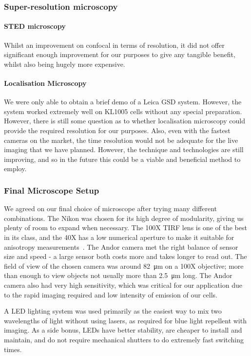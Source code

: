 \documentclass[../main.tex]{subfiles}
\begin{document}
\subsubsection{Super-resolution microscopy}

\paragraph{STED microscopy} Whilst an improvement on confocal in terms of resolution, it did not offer significant enough improvement for our purposes to give any tangible benefit, whilst also being hugely more expensive.

\paragraph{Localisation Microscopy} We were only able to obtain a brief demo of a Leica GSD system. However, the system worked extremely well on KL1005 cells without any special preparation. However, there is still some question as to whether localisation microscopy could provide the required resolution for our purposes. Also, even with the fastest cameras on the market, the time resolution would not be adequate for the live imaging that we have planned. However, the technique and technologies are still improving, and so in the future this could be a viable and beneficial method to employ.

\subsubsection{Final Microscope Setup}

We agreed on our final choice of microscope after trying many different combinations. The Nikon was chosen for its high degree of modularity, giving us plenty of room to expand when necessary. The 100X TIRF lens is one of the best in its class, and the 40X has a low numerical aperture to make it suitable for anisotropy measurements~\citep{lakowicz}. The Andor camera met the right balance of sensor size and speed - a large sensor both costs more and takes longer to read out. The field of view of the chosen camera was around \SI{82}{\micro\meter} on a 100X objective; more than enough to view objects not usually more than \SI{2.5}{\micro\meter} long. The Andor camera also had very high sensitivity, which was critical for our application due to the rapid imaging required and low intensity of emission of our cells.

A LED lighting system was used primarily as the easiest way to mix two wavelengths of light without using lasers, as required for blue light repellent with imaging. As a side bonus, LEDs have better stability, are cheaper to install and maintain, and do not require mechanical shutters to do extremely fast switching times. 
\end{document}
